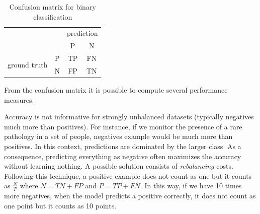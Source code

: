 \begin{table}[ht]
	\centering
	\begin{tabular}{cc|cc|}
		\cline{3-4}                                         &   & \multicolumn{2}{c|}{prediction} \\
		\cline{3-4}                                         &   & \multicolumn{1}{c|}{P}         & N  \\
		\hline
		\multicolumn{1}{|c|}{\multirow{2}{*}{ground truth}} & P & \multicolumn{1}{c|}{TP}        & FN \\
		\cline{2-4} \multicolumn{1}{|c|}{}                  & N & \multicolumn{1}{c|}{FP}        & TN \\
		\hline
	\end{tabular}
	\caption{Confusion matrix for binary classification}
	\label{fig:binClassConfusionMatrix}
\end{table}

From the confusion matrix it is possible to compute several performance measures.


Accuracy is not informative for strongly unbalanced datasets (typically negatives
much more than positives). For instance, if we monitor the presence of a rare
pathology in a set of people, negatives example would be much more than positives.
In this context, predictions are dominated by the larger class. As a consequence,
predicting everything as negative often maximizes the accuracy without learning nothing.
A possible solution consists of \textit{rebalancing} costs. Following this
technique, a positive example does not count as one but it counts as $\frac{N}{P}$
where $N=TN+FP$ and $P=TP+FN$. In this way, if we have 10 times more negatives,
when the model predicts a positive correctly, it does not count as one point but
it counts as 10 points.


